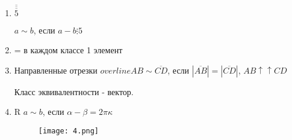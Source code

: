 \begin{eg}

    
\begin{enumerate}

    \item $\overline {\overline {\overline {5}}}$
    
    $a \sim b$, если $a - b \vdots 5$
    \item = в каждом классе 1 элемент
    
    \item Направленные отрезки $overline{AB} \sim \overline{CD}$, если $|\overline{AB}| = |\overline{CD}|$, $AB \uparrow\uparrow CD$
    

    Класс эквивалентности - вектор.
    \item R $a \sim b$, если $\alpha - \beta = 2 \pi \kappa$
    \begin{figure}[H]
        \centering
        \texttt{[image: 4.png]}
        
        
        \label{fig:4}
    \end{figure}
\end{enumerate}
\end{eg}

